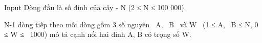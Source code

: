 Input
Dòng đầu là số đỉnh của cây - N (2 ≤ N ≤ 100 000).

N-1 dòng tiếp theo mỗi dòng gồm 3 số nguyên  A,  B  và W  (1 ≤ A,  B ≤ N, 0 ≤ W ≤  1000) mô tả cạnh nối hai đỉnh A, B có trọng số W.